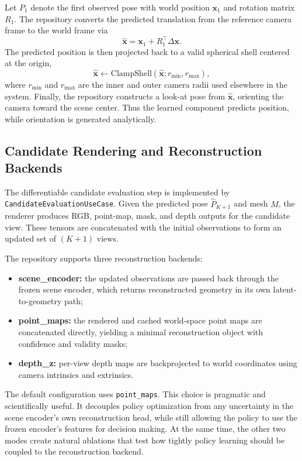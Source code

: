 Let $P_1$ denote the first observed pose with world position $\mathbf{x}_1$ and rotation matrix $R_1$. The repository converts the predicted translation from the reference camera frame to the world frame via
\begin{equation}
    \hat{\mathbf{x}} = \mathbf{x}_1 + R_1^{\top}\Delta \mathbf{x}.
\end{equation}
The predicted position is then projected back to a valid spherical shell centered at the origin,
\begin{equation}
    \hat{\mathbf{x}} \leftarrow \mathrm{ClampShell}(\hat{\mathbf{x}}; r_{\min}, r_{\max}),
\end{equation}
where $r_{\min}$ and $r_{\max}$ are the inner and outer camera radii used elsewhere in the system. Finally, the repository constructs a look-at pose from $\hat{\mathbf{x}}$, orienting the camera toward the scene center. Thus the learned component predicts position, while orientation is generated analytically.

\subsection{Candidate Rendering and Reconstruction Backends}
\label{sec:candidate_eval}

The differentiable candidate evaluation step is implemented by \texttt{CandidateEvaluationUseCase}. Given the predicted pose $\hat{P}_{K+1}$ and mesh $M$, the renderer produces RGB, point-map, mask, and depth outputs for the candidate view. These tensors are concatenated with the initial observations to form an updated set of $(K+1)$ views.

The repository supports three reconstruction backends:
\begin{itemize}
    \item \textbf{scene\_encoder:} the updated observations are passed back through the frozen scene encoder, which returns reconstructed geometry in its own latent-to-geometry path;
    \item \textbf{point\_maps:} the rendered and cached world-space point maps are concatenated directly, yielding a minimal reconstruction object with confidence and validity masks;
    \item \textbf{depth\_z:} per-view depth maps are backprojected to world coordinates using camera intrinsics and extrinsics.
\end{itemize}

The default configuration uses \texttt{point\_maps}. This choice is pragmatic and scientifically useful. It decouples policy optimization from any uncertainty in the scene encoder's own reconstruction head, while still allowing the policy to use the frozen encoder's features for decision making. At the same time, the other two modes create natural ablations that test how tightly policy learning should be coupled to the reconstruction backend.

